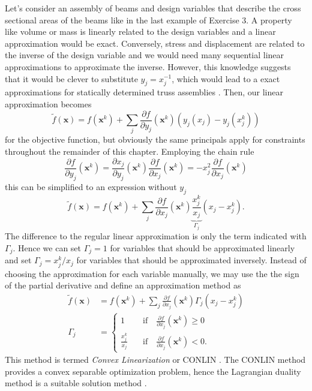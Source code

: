 Let's consider an assembly of beams and design variables that describe the cross sectional areas of the beams like in the last example of Exercise 3. A property like volume or mass is linearly related to the design variables and a linear approximation would be exact. Conversely, stress and displacement are related to the inverse of the design variable and we would need many sequential linear approximations to approximate the inverse.  However, this knowledge suggests that it would be clever to substitute $y_j = x^{-1}_j$, which would lead to a exact approximations for statically determined truss assemblies \cite{Christensen2008}. 
Then, our linear approximation becomes 
\begin{equation}
    \tilde{f}(\mathbf{x}) = f(\mathbf{x}^k) + \sum_j \frac{\partial f}{\partial y_j}(\mathbf{x}^k) \left(y_j(x_j) - y_j(x^k_j) \right)
\end{equation}
for the objective function, but obviously the same principals apply for constraints throughout the remainder of this chapter.
Employing the chain rule
\begin{equation}
    \frac{\partial f}{\partial y_j} (\mathbf{x}^k) 
    = \frac{\partial x_j}{\partial y_j}(\mathbf{x}^k) \frac{\partial f}{\partial x_j} (\mathbf{x}^k)   
    = -x^2_j \frac{\partial f}{\partial x_j}(\mathbf{x}^k) 
\end{equation}
this can be simplified to an expression without $y_j$
\begin{equation}
    \tilde{f}(\mathbf{x}) = f(\mathbf{x}^k) + \sum_j \frac{\partial f}{\partial x_j}(\mathbf{x}^k) \underbrace{\frac{x^k_j}{x_j}}_{\Gamma_j} \left(x_j - x^k_j \right). 
\end{equation}
The difference to the regular linear approximation is only the term indicated with $\Gamma_j$. Hence we can set $\Gamma_j = 1$ for variables that should be approximated linearly and set $\Gamma_j = x^k_j / x_j$ for variables that should be approximated inversely. Instead of choosing the approximation for each variable manually, we may use the the sign of the partial derivative and define an approximation method as 
\begin{align}
    \tilde{f}(\mathbf{x}) &= f(\mathbf{x}^k) + \sum_j \frac{\partial f}{\partial x_j}(\mathbf{x}^k) \Gamma_j \left(x_j - x^k_j \right) \\
    \Gamma_j &= 
    \begin{cases}
        1 &\quad \text{if} \quad \frac{\partial f}{\partial x_j} (\mathbf{x}^k) \ge 0 \\
        \frac{x^k_j}{x_j} &\quad \text{if} \quad \frac{\partial f}{\partial x_j} (\mathbf{x}^k) < 0.
    \end{cases}
\end{align}
This method is termed \emph{Convex Linearization} or CONLIN \cite{Fleury1989}. The CONLIN method provides a convex separable optimization problem, hence the Lagrangian duality method is a suitable solution method  \cite{Christensen2008,Harzheim2014}.

